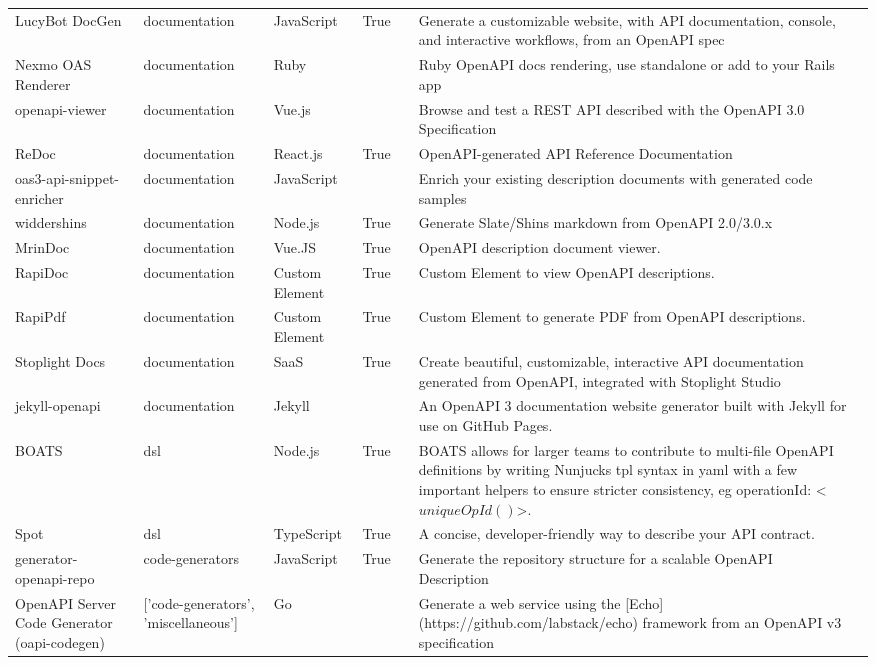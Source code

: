 \begin{table*}[htb]
{\begin{tabular}{p{2cm}p{2cm}p{2cm}p{2cm}p{2cm}p{4cm}p{2cm}}
LucyBot DocGen & documentation & JavaScript & True &  & Generate a customizable website, with API documentation, console, and interactive workflows, from an OpenAPI spec \\
Nexmo OAS Renderer & documentation & Ruby &  &  & Ruby OpenAPI docs rendering, use standalone or add to your Rails app \\
openapi-viewer & documentation & Vue.js &  &  & Browse and test a REST API described with the OpenAPI 3.0 Specification \\
ReDoc & documentation & React.js & True &  & OpenAPI-generated API Reference Documentation \\
oas3-api-snippet-enricher & documentation & JavaScript &  &  & Enrich your existing description documents with generated code samples \\
widdershins & documentation & Node.js & True &  & Generate Slate/Shins markdown from OpenAPI 2.0/3.0.x \\
MrinDoc & documentation & Vue.JS & True &  & OpenAPI description document viewer. \\
RapiDoc & documentation & Custom Element & True &  & Custom Element to view OpenAPI descriptions. \\
RapiPdf & documentation & Custom Element & True &  & Custom Element to generate PDF from OpenAPI descriptions. \\
Stoplight Docs & documentation & SaaS & True &  & Create beautiful, customizable, interactive API documentation generated from OpenAPI, integrated with Stoplight Studio \\
jekyll-openapi & documentation & Jekyll &  &  & An OpenAPI 3 documentation website generator built with Jekyll for use on GitHub Pages. \\
BOATS & dsl & Node.js & True &  & BOATS allows for larger teams to contribute to multi-file OpenAPI definitions by writing Nunjucks tpl syntax in yaml with a few
important helpers to ensure stricter consistency, eg operationId: <$ uniqueOpId() $>.
 \\
Spot & dsl & TypeScript & True &  & A concise, developer-friendly way to describe your API contract. \\
generator-openapi-repo & code-generators & JavaScript & True &  & Generate the repository structure for a scalable OpenAPI Description \\
OpenAPI Server Code Generator (oapi-codegen) & ['code-generators', 'miscellaneous'] & Go &  &  & Generate a web service using the [Echo](https://github.com/labstack/echo) framework from an OpenAPI v3 specification \\

\end{tabular}}
\end{table*}
